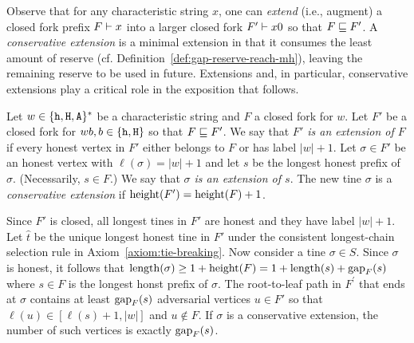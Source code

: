 Observe that for any characteristic string $x$, 
one can \emph{extend} (i.e., augment) a closed fork prefix $F \vdash x$ 
into a larger closed fork $F' \vdash x0$ so that $F \sqsubseteq F'$. 
A \emph{conservative extension} is a minimal extension in that 
it consumes the least amount of reserve (cf. Definition~\ref{def:gap-reserve-reach-mh}), 
leaving the remaining reserve to be used in future.
Extensions and, in particular, conservative extensions 
play a critical role in the exposition that follows. 

\begin{definition}[Extensions]\label{def:extension-mh}  
  Let $w \in \{\mathtt{h}, \mathtt{H}, \mathtt{A}\}^*$ be a characteristic string 
  and $F$ a closed fork for $w$. 
  Let $F'$ be a closed fork for $wb, b \in \{\mathtt{h}, \mathtt{H}\}$ 
  so that $F \sqsubseteq F'$. 
  We say that \emph{$F'$ is an extension of $F$} if 
  every honest vertex in $F'$ either belongs to $F$ or has label $|w| + 1$. 
  Let $\sigma \in F'$ be an honest vertex with $\ell(\sigma) = |w| + 1$ 
  and let $s$ be the longest honest prefix of $\sigma$. 
  (Necessarily, $s \in F$.)
  We say that \emph{$\sigma$ is an extension of $s$}. 
  The new tine $\sigma$ is a \emph{conservative extension} if 
  $\operatorname{height}(F') = \operatorname{height}(F) + 1$.  
\end{definition} 
Since $F'$ is closed, all longest tines in $F'$ are honest and they have label $|w| + 1$.
Let $\hat{t}$ be the unique longest honest tine in $F'$ 
under the consistent longest-chain selection rule 
in Axiom~\ref{axiom:tie-breaking}.
Now consider a tine $\sigma \in S$. 
Since $\sigma$ is honest, 
it follows that 
$\operatorname{length}(\sigma) 
\geq 1 + \operatorname{height}(F) 
= 1 + \operatorname{length}(s) + \operatorname{gap}_F(s)$ 
where $s \in F$ is the longest honst prefix of $\sigma$.
The root-to-leaf path in $F^\prime$ 
that ends at $\sigma$ 
contains at least $\operatorname{gap}_F(s)$ adversarial vertices $u \in F'$ 
so that $\ell(u) \in [\ell(s) + 1, |w|]$ and 
$u \not \in F$. 
If $\sigma$ is a conservative extension, 
the number of such vertices is exactly $\operatorname{gap}_F(s)$. 


